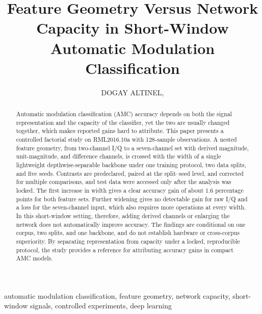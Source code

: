 \documentclass{ieeeaccess}
\begin{document}
\title{Feature Geometry Versus Network Capacity in Short-Window Automatic Modulation Classification}

\author{\uppercase{Dogay Altinel}, }
\address[1]{Department of Electrical and Electronics Engineering, Istanbul Medeniyet University, Istanbul 34700, T\"urkiye}


\begin{abstract}
Automatic modulation classification (AMC) accuracy depends on both the signal
representation and the capacity of the classifier, yet the two are usually
changed together, which makes reported gains hard to attribute. This paper
presents a controlled factorial study on RML2016.10a with 128-sample
observations. A nested feature geometry, from two-channel I/Q to a seven-channel
set with derived magnitude, unit-magnitude, and difference channels, is crossed
with the width of a single lightweight depthwise-separable backbone under one
training protocol, two data splits, and five seeds. Contrasts are predeclared,
paired at the split--seed level, and corrected for multiple comparisons, and test
data were accessed only after the analysis was locked. The first increase in
width gives a clear accuracy gain of about 1.6 percentage points for both
feature sets. Further widening gives no detectable gain for raw I/Q and a loss
for the seven-channel input, which also requires more operations at every width.
In this short-window setting, therefore, adding derived channels or enlarging
the network does not automatically improve accuracy. The findings are
conditional on one corpus, two splits, and one backbone, and do not establish
hardware or cross-corpus superiority. By separating representation from
capacity under a locked, reproducible protocol, the study provides a reference
for attributing accuracy gains in compact AMC models.
\end{abstract}

\begin{IEEEkeywords}
automatic modulation classification, feature geometry, network capacity, short-window signals, controlled experiments, deep learning
\end{IEEEkeywords}
\end{document}
